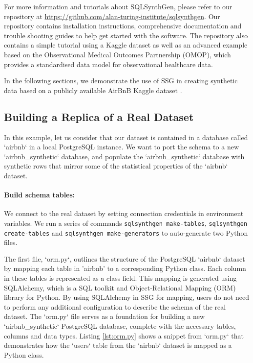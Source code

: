 \documentclass[11pt]{article}
\begin{document}
For more information and tutorials about SQLSynthGen, please refer to our repository at \url{https://github.com/alan-turing-institute/sqlsynthgen}. Our repository \cite{repository} contains installation instructions, comprehensive documentation and trouble shooting guides to help get started with the software. The repository also contains a simple tutorial using a Kaggle dataset \cite{airbnb} as well as an advanced example based on the Observational Medical Outcomes Partnership (OMOP)\cite{omop}, which provides a standardised data model for observational healthcare data. 

In the following sections, we demonstrate the use of SSG in creating synthetic data based on a publicly available AirBnB Kaggle dataset \cite{airbnb}.

\subsection{Building a Replica of a Real Dataset}

In this example, let us consider that our dataset is contained in a database called `airbnb` in a local PostgreSQL instance. We want to port the schema to a new `airbnb\_synthetic` database, and populate the `airbnb\_synthetic` database with synthetic rows that mirror some of the statistical properties of the `airbnb` dataset.

\paragraph{Build schema tables:}

We connect to the real dataset by setting connection credentials in environment variables. We run a series of commands \texttt{sqlsynthgen make-tables}, \texttt{sqlsynthgen create-tables} and \texttt{sqlsynthgen make-generators} to auto-generate two Python files. 

The first file, `orm.py`, outlines the structure of the PostgreSQL `airbnb` dataset by mapping each table in 'airbnb' to a corresponding Python class. Each column in these tables is represented as a class field. This mapping is generated using SQLAlchemy\cite{sqlalchemy}, which is a SQL toolkit and Object-Relational Mapping (ORM) library for Python. By using SQLAlchemy in SSG for mapping, users do not need to perform any additional configuration to describe the schema of the real dataset. The `orm.py` file serves as a foundation for building a new `airbnb\_synthetic` PostgreSQL database, complete with the necessary tables, columns and data types. Listing \ref{lst:orm.py} shows a snippet from `orm.py` that demonstrates how the  `users` table from the `airbnb`  dataset is mapped as a Python class.
\end{document}

